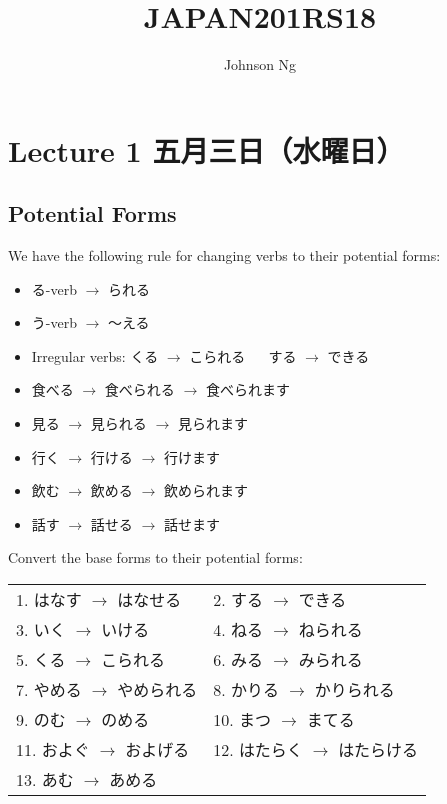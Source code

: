 \documentclass[notoc,notitlepage]{tufte-book}
\title{JAPAN201RS18}
\author{Johnson Ng}
\begin{document}
\hypersetup{pageanchor=false}
\maketitle
\hypersetup{pageanchor=true}
\tableofcontents

\chapter{Lecture 1 五月三日（水曜日）}
  \label{chapter:lecture_1_may_03rd_2018}

\section{Potential Forms} %
\label{sec:potential_forms}

We have the following rule for changing verbs to their potential forms:
\begin{itemize}
  \item る-verb $\to$ られる 
  \item う-verb $\to$ 〜える 
  \item Irregular verbs: くる $\to$ こられる $\quad$ する $\to$ できる
\end{itemize}

\begin{eg}
  \begin{itemize}
    \item 食べる $\to$ 食べられる $\to$ 食べられます
    \item 見る $\to$ 見られる $\to$ 見られます
  \end{itemize}
  
\noindent{}
  \begin{itemize}
    \item 行く $\to$ 行ける $\to$ 行けます
    \item 飲む $\to$ 飲める $\to$ 飲められます
    \item 話す $\to$ 話せる $\to$ 話せます
  \end{itemize}
\end{eg}

\begin{ex}
Convert the base forms to their potential forms:  \\
  \begin{tabular}{l l}
    1. はなす $\to$ はなせる   & 2. する $\to$ できる \\
    3. いく $\to$ いける       & 4. ねる $\to$ ねられる \\
    5. くる $\to$ こられる     & 6. みる $\to$ みられる \\
    7. やめる $\to$ やめられる & 8. かりる $\to$ かりられる \\
    9. のむ $\to$ のめる       & 10. まつ $\to$ まてる \\
    11. およぐ $\to$ およげる  & 12. はたらく $\to$ はたらける \\
    13. あむ $\to$ あめる
  \end{tabular}
\end{ex}
\end{document}
